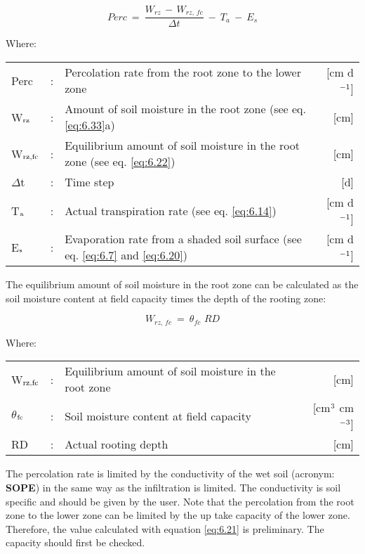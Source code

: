 \begin{equation}
\label{eq:6.21}
Perc  ~=~{\frac{W _{rz} \, -\, W _{rz,\, fc} }{\Delta t}} ~-~ T _{a} ~-~ E _{s} 
\end{equation}

Where:\\[5pt]
\begin{tabularx}{\textwidth}{llXr}
	Perc &:& Percolation rate from the root zone to the lower zone  & [cm d$^{{\rm -1}}$]\\
	W$_{{\rm rz}}$ &:& Amount of soil moisture in the root zone (see eq. \ref{eq:6.33}a)  & [cm]\\
	W$_{{\rm rz,fc}}$ &:& Equilibrium amount of soil moisture in the root
	zone (see eq. \ref{eq:6.22})  & [cm]\\
	$\Delta$t &:& Time step  & [d]\\
	T$_{{\rm a}}$ &:& Actual transpiration rate (see eq. \ref{eq:6.14})  & [cm d$^{{\rm -1}}$]\\
	E$_{{\rm s}}$ &:& Evaporation rate from a shaded soil surface 
	(see eq. \ref{eq:6.7}  and \ref{eq:6.20})  & [cm d$^{{\rm -1}}$]\\
\end{tabularx}

The equilibrium amount of soil moisture in the root zone can be calculated as the soil
moisture content at field capacity times the depth of the rooting zone:

\begin{equation}
\label{eq:6.22}
W _{rz,\, fc} ~=~ \theta  _{fc} \,\, RD
\end{equation}

Where:\\[5pt]
\begin{tabularx}{\textwidth}{llXr}
	W$_{{\rm rz,fc}}$ &:& Equilibrium amount of soil moisture in the root zone  & [cm]\\
	$\theta$$_{{\rm fc}}$ &:& Soil moisture content at field capacity  & 
	[cm$^{{\rm 3}}$ cm$^{{\rm -3}}$]\\
	RD &:& Actual rooting depth  & [cm]\\
\end{tabularx}

The percolation rate is limited by the conductivity of the wet soil (acronym: {\bf SOPE}) in the
same way as the infiltration is limited. The conductivity is soil specific and should be
given by the user. Note that the percolation from the root zone to the lower zone can be
limited by the up take capacity of the lower zone. Therefore, the value calculated with 
equation \ref{eq:6.21} is preliminary. The capacity should first be checked.

